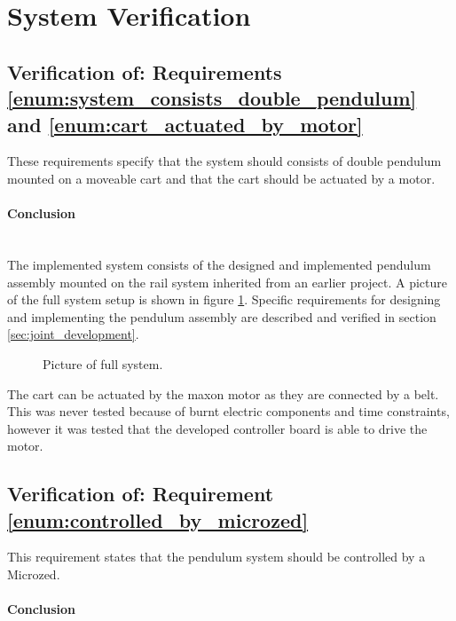 \section{System Verification}
\label{sec:system_verification}

\subsection{Verification of: Requirements \ref{enum:system_consists_double_pendulum} and \ref{enum:cart_actuated_by_motor}} %
\label{sub:verification_of_requirement_enum:system_consists_double_pendulum}
These requirements specify that the system should consists of double pendulum mounted on a moveable cart and that the cart should be actuated by a motor.

\paragraph{Conclusion}~\\
The implemented system consists of the designed and implemented pendulum assembly mounted on the rail system inherited from an earlier project.
A picture of the full system setup is shown in figure \ref{fig:pic_full_system}.
Specific requirements for designing and implementing the pendulum assembly are described and verified in section \ref{sec:joint_development}.
\begin{figure}
	\centering
	\caption{Picture of full system.}
	\label{fig:pic_full_system}
\end{figure}
The cart can be actuated by the maxon motor as they are connected by a belt. 
This was never tested because of burnt electric components and time constraints, however it was tested that the developed controller board is able to drive the motor.



\subsection{Verification of: Requirement \ref{enum:controlled_by_microzed}} %
\label{sub:verification_of_requirement_enum:controlled_by_microzed}
This requirement states that the pendulum system should be controlled by a Microzed.

\paragraph{Conclusion}~\\
\label{sec:controller_board}


